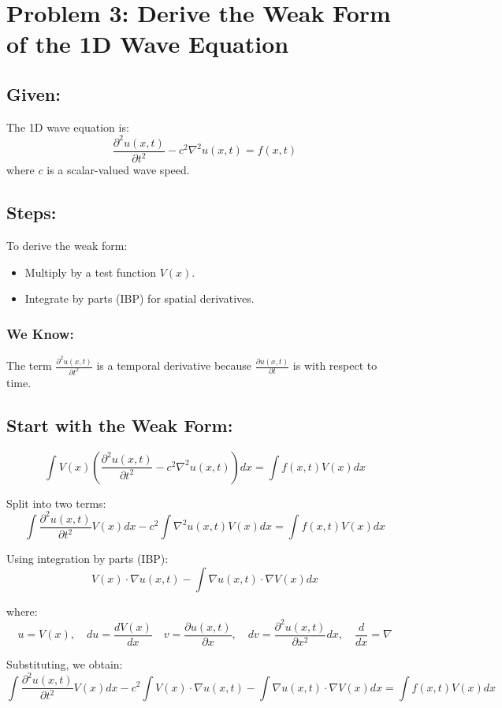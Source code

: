 \documentclass[11pt]{article}
\begin{document}
\section*{Problem 3: Derive the Weak Form of the 1D Wave Equation}

\subsection*{Given:}
The 1D wave equation is:
\[
\frac{\partial^2 u(x, t)}{\partial t^2} - c^2 \nabla^2 u(x, t) = f(x, t)
\]
where \(c\) is a scalar-valued wave speed.

\subsection*{Steps:}
To derive the weak form:
\begin{itemize}
    \item Multiply by a test function \(V(x)\).
    \item Integrate by parts (IBP) for spatial derivatives.
\end{itemize}

\subsubsection*{We Know:}
The term \(\frac{\partial^2 u(x, t)}{\partial t^2}\) is a temporal derivative because \(\frac{\partial u(x, t)}{\partial t}\) is with respect to time.

\subsection*{Start with the Weak Form:}
\[
\int V(x) \left( \frac{\partial^2 u(x, t)}{\partial t^2} - c^2 \nabla^2 u(x, t) \right) dx = \int f(x, t) V(x) dx
\]

Split into two terms:
\[
\int \frac{\partial^2 u(x, t)}{\partial t^2} V(x) dx - c^2 \int \nabla^2 u(x, t) V(x) dx = \int f(x, t) V(x) dx
\]

Using integration by parts (IBP):
\[
V(x) \cdot \nabla u(x, t) - \int \nabla u(x, t) \cdot \nabla V(x) dx
\]

where:
\[
u = V(x), \quad  du = \frac{dV(x)}{dx} \quad v = \frac{\partial u(x, t)}{\partial x}, \quad dv = \frac{\partial^2 u(x, t)}{\partial x^2} dx, \quad \frac{d}{dx} = \nabla
\]

Substituting, we obtain:
\[
\int \frac{\partial^2 u(x, t)}{\partial t^2} V(x) dx - c^2 \int V(x) \cdot \nabla u(x, t) - \int \nabla u(x, t) \cdot \nabla V(x) dx = \int f(x, t) V(x) dx
\]
\end{document}
